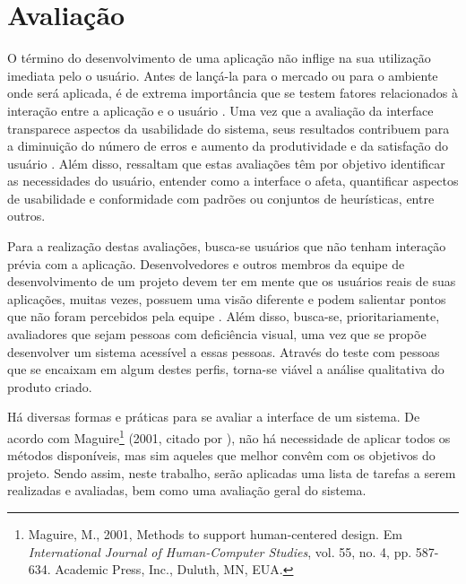 \chapter{\label{chap:avaliacao}Avaliação}

O término do desenvolvimento de uma aplicação não inflige na sua utilização imediata pelo o usuário. Antes de lançá-la para o mercado ou para o ambiente onde será aplicada, é de extrema importância que se testem fatores relacionados à interação entre a aplicação e o usuário \cite{PRATES2003}. Uma vez que a avaliação da interface transparece aspectos da usabilidade do sistema, seus resultados contribuem para a diminuição do número de erros e aumento da produtividade e da satisfação do usuário \cite{WINCKLER2002}. Além disso, \cite{PRATES2003} ressaltam que estas avaliações têm por objetivo identificar as necessidades do usuário, entender como a interface o afeta, quantificar aspectos de usabilidade e conformidade com padrões ou conjuntos de heurísticas, entre outros.

Para a realização destas avaliações, busca-se usuários que não tenham interação prévia com a aplicação. Desenvolvedores e outros membros da equipe de desenvolvimento de um projeto devem ter em mente que os usuários reais de suas aplicações, muitas vezes, possuem uma visão diferente e podem salientar pontos que não foram percebidos pela equipe \cite{PRATES2003}. Além disso, busca-se, prioritariamente, avaliadores que sejam pessoas com deficiência visual, uma vez que se propõe desenvolver um sistema acessível a essas pessoas. Através do teste com pessoas que se encaixam em algum destes perfis, torna-se viável a análise qualitativa do produto criado.

Há diversas formas e práticas para se avaliar a interface de um sistema. De acordo com Maguire\footnote{Maguire, M., 2001, Methods to support human-centered design. Em \emph{International Journal of Human-Computer Studies}, vol. 55, no. 4, pp. 587-634. Academic Press, Inc., Duluth, MN, EUA.} (2001, citado por \cite{WICH2015}), não há necessidade de aplicar todos os métodos disponíveis, mas sim aqueles que melhor convêm com os objetivos do projeto. Sendo assim, neste trabalho, serão aplicadas uma lista de tarefas a serem realizadas e avaliadas, bem como uma avaliação geral do sistema.

